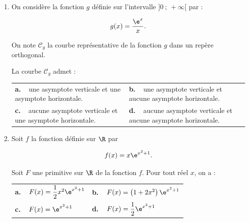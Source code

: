 \begin{enumerate}[resume]
\item On considère la fonction $g$ définie sur l'intervalle $]0~;~+\infty[$ par : 

\[g(x) = \dfrac{\e^x}{x}.\]

On note $\mathcal{C}_g$ la courbe représentative de la fonction $g$ dans un repère orthogonal.

La courbe $\mathcal{C}_g$ admet :

\begin{center}
\begin{tabularx}{\linewidth}{X X}
\textbf{a.~~}une asymptote verticale
et une asymptote horizontale.&\textbf{b.~~}une asymptote verticale
et aucune asymptote horizontale.\\
\textbf{c.~~}aucune asymptote verticale et une asymptote horizontale.&\textbf{d.~~}aucune asymptote verticale et aucune asymptote horizontale.
\end{tabularx}
\end{center}
\item Soit $f$ la fonction définie sur $\R$ par

\[f(x) = x\e^{x^2+1}.\]

Soit $F$ une primitive sur $\R$ de la fonction $f$. Pour tout réel $x$, on a :

\begin{center}
\begin{tabularx}{\linewidth}{X X}
\textbf{a.~~}$F(x) = \dfrac12x^2\e^{x^2+1}$ 	& \textbf{b.~~}$F(x) = \left(1 + 2x^2 \right)\e^{x^2+1}$ \\
\textbf{c.~~}$F(x) = \e^{x^2+1}$				& \textbf{d.~~}$F(x) = \dfrac12\e^{x^2+1}$
\end{tabularx}
\end{center}
\end{enumerate}
